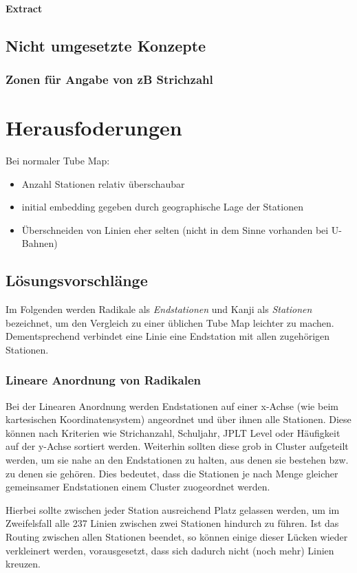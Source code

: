 \documentclass[color,german]{tudbook}
\begin{document}
\subsubsection{Extract}

\section{Nicht umgesetzte Konzepte}
\subsection{Zonen für Angabe von zB Strichzahl}

\chapter{Herausfoderungen}
Bei normaler Tube Map:
\begin{itemize}
\item Anzahl Stationen relativ überschaubar
\item initial embedding gegeben durch geographische Lage der Stationen
\item Überschneiden von Linien eher selten (nicht in dem Sinne vorhanden bei U-Bahnen)
\end{itemize}

\section{Lösungsvorschlänge}
Im Folgenden werden Radikale als \emph{Endstationen} und Kanji als \emph{Stationen} bezeichnet, um den Vergleich zu einer üblichen Tube Map leichter zu machen. Dementsprechend verbindet eine Linie eine Endstation mit allen zugehörigen Stationen.
\subsection{Lineare Anordnung von Radikalen}
Bei der Linearen Anordnung werden Endstationen auf einer x-Achse (wie beim kartesischen Koordinatensystem) angeordnet und über ihnen alle Stationen. Diese können nach Kriterien wie Strichanzahl, Schuljahr, JPLT Level oder Häufigkeit auf der y-Achse sortiert werden. Weiterhin sollten diese grob in Cluster aufgeteilt werden, um sie nahe an den Endstationen zu halten, aus denen sie bestehen bzw. zu denen sie gehören. Dies bedeutet, dass die Stationen je nach Menge gleicher gemeinsamer Endstationen einem Cluster zuogeordnet werden.

Hierbei sollte zwischen jeder Station ausreichend Platz gelassen werden, um im Zweifelsfall alle 237 Linien zwischen zwei Stationen hindurch zu führen. Ist das Routing zwischen allen Stationen beendet, so können einige dieser Lücken wieder verkleinert werden, vorausgesetzt, dass sich dadurch nicht (noch mehr) Linien kreuzen. 
\end{document}
